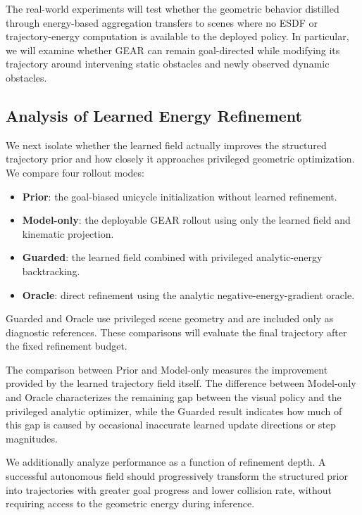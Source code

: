 \documentclass[letterpaper, 10 pt, conference]{ieeeconf}  %
\begin{document}
The real-world experiments will test whether the geometric behavior distilled
through energy-based aggregation transfers to scenes where no ESDF or
trajectory-energy computation is available to the deployed policy. In
particular, we will examine whether GEAR can remain goal-directed while
modifying its trajectory around intervening static obstacles and newly
observed dynamic obstacles.

\subsection{Analysis of Learned Energy Refinement}
\label{sec:energy_analysis}

We next isolate whether the learned field actually improves the structured
trajectory prior and how closely it approaches privileged geometric
optimization. We compare four rollout modes:
\begin{itemize}
    \item \textbf{Prior}: the goal-biased unicycle initialization without
    learned refinement.
    \item \textbf{Model-only}: the deployable GEAR rollout using only the
    learned field and kinematic projection.
    \item \textbf{Guarded}: the learned field combined with privileged
    analytic-energy backtracking.
    \item \textbf{Oracle}: direct refinement using the analytic
    negative-energy-gradient oracle.
\end{itemize}

Guarded and Oracle use privileged scene geometry and are included only as
diagnostic references. These comparisons will evaluate the final trajectory
after the fixed refinement budget.

The comparison between Prior and Model-only measures the improvement provided
by the learned trajectory field itself. The difference between Model-only and
Oracle characterizes the remaining gap between the visual policy and the
privileged analytic optimizer, while the Guarded result indicates how much of
this gap is caused by occasional inaccurate learned update directions or step
magnitudes.

We additionally analyze performance as a function of refinement depth. A
successful autonomous field should progressively transform the structured
prior into trajectories with greater goal progress and lower collision rate,
without requiring access to the geometric energy during inference.
\end{document}
